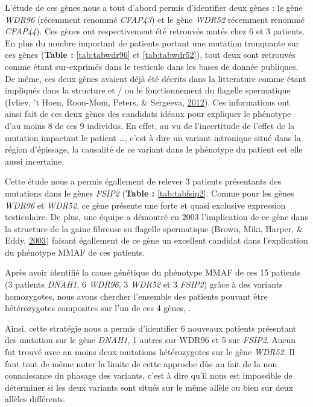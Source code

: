 \documentclass[12pt,twoside]{reedthesis}
\theoremstyle{definition}
\theoremstyle{definition}
\theoremstyle{remark}
\begin{document}
  L'étude de ces gènes nous a tout d'abord permis d'identifier deux gènes
  : le gène \emph{WDR96} (récemment renommé \emph{CFAP43}) et le gène
  \emph{WDR52} récemment renommé \emph{CFAP44}). Ces gènes ont
  respectivement été retrouvés mutés chez 6 et 3 patients. En plus du
  nombre important de patients portant une mutation tronquante sur ces
  gènes (\textbf{Table : }\ref{tab:tabwdr96} et \ref{tab:tabwdr52}), tout
  deux sont retrouvés comme étant sur-exprimés dans le testicule dans les
  bases de donnée publiques. De même, ces deux gènes avaient déjà été
  décrits dans la litterature comme étant impliqués dans la structure et /
  ou le fonctionnement du flagelle spermatique (Ivliev, 't Hoen, Roon-Mom,
  Peters, \& Sergeeva, \protect\hyperlink{ref-Ivliev2012}{2012}). Ces
  informations ont ainsi fait de ces deux gènes des candidats idéaux pour
  expliquer le phénotype d'au moins 8 de ces 9 individus. En effet, au vu
  de l'incertitude de l'effet de la mutation impactant le patient
  \ldots{}, c'est à dire un variant intronique situé dans la région
  d'épissage, la causalité de ce variant dans le phénotype du patient est
  elle aussi incertaine.
  
  Cette étude nous a permis égallement de relever 3 patients présentants
  des mutations dans le gènes \emph{FSIP2} (\textbf{Table :
  }\ref{tab:tabfsip2}. Comme pour les gènes \emph{WDR96} et \emph{WDR52},
  ce gène présente une forte et quasi exclusive expression testiculaire.
  De plus, une équipe a démontré en 2003 l'implication de ce gène dans la
  structure de la gaine fibreuse su flagelle spermatique (Brown, Miki,
  Harper, \& Eddy, \protect\hyperlink{ref-Brown2003}{2003}) faisant
  égallement de ce gène un excellent candidat dans l'explication du
  phénotype MMAF de ces patients.
  
  Après avoir identifié la cause génétique du phénotype MMAF de ces 15
  patients (3 patients \emph{DNAH1}, 6 \emph{WDR96}, 3 \emph{WDR52} et 3
  \emph{FSIP2}) grâce à des variants homozygotes, nous avons chercher
  l'ensemble des patients pouvant être hétérozygotes composites sur l'un
  de ces 4 gènes, .
  
  Ainsi, cette stratégie nous a permis d'identifier 6 nouveaux patients
  présentant des mutation sur le gène \emph{DNAH1}, 1 autres sur WDR96 et
  5 sur \emph{FSIP2}. Aucun fut trouvé avec au moins deux mutations
  hétérozygotes sur le gène \emph{WDR52}. Il faut tout de même noter la
  limite de cette approche dûe au fait de la non connaissance du phasage
  des variants, c'est à dire qu'il nous est impossible de déterminer si
  les deux variants sont situés sur le même allèle ou bien sur deux
  allèles différents.
  
\end{document}
